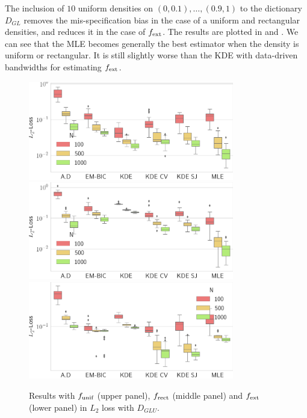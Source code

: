 The inclusion of  $10$ uniform densities on $(0,0.1),\dots,(0.9,1)$ to the dictionary $D_{GL}$ removes the mis-specification
bias in the case of a uniform and rectangular densities, and reduces it in the case of $f_{\textnormal{ext}}$.
The results are plotted in  and . 
We can see that the MLE becomes generally the best estimator when the density is uniform or rectangular. 
It is still slightly worse than the KDE with data-driven bandwidths for estimating $f_{\textnormal{ext}}$.
 \begin{figure}
\center
    \includegraphics[width=0.8\textwidth]{./TeX_files/res_uniform_L2_GLU.png}
    \includegraphics[width=0.8\textwidth]{./TeX_files/res_rect_L2_GLU.png}
    \includegraphics[width=0.8\textwidth]{./TeX_files/res_lapl_gauss_not_dict_L2_GLU.png}
    \caption{Results with $f_{\textnormal{unif}}$ (upper panel), $f_{\textnormal{rect}}$ 
    (middle panel) and $f_{\textnormal{ext}}$ (lower panel) in $L_2$ loss with $D_{GLU}$.}
    \label{fig:res_gauss_L2_GLU}
\end{figure}
